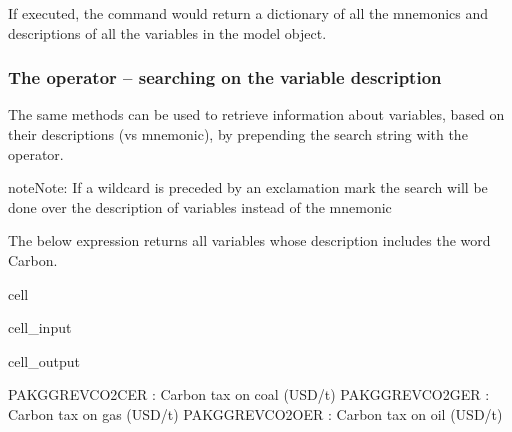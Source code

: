\documentclass[letterpaper,10pt,english]{jupyterBook}
\begin{document}
\sphinxAtStartPar
If executed, the command  would return a dictionary of all the mnemonics and descriptions of all the variables in the  model object.


\subsubsection{The \sphinxstyleliteralintitle{\sphinxupquote{!}} operator – searching on the variable description}
\label{\detokenize{content/05_WBModels/LoadingWBModel:the-operator-searching-on-the-variable-description}}
\sphinxAtStartPar
The same methods can be used to retrieve information about variables, based on their descriptions (vs mnemonic), by pre\sphinxhyphen{}pending the search string with the  \sphinxcode{\sphinxupquote{!}} operator.

\begin{sphinxadmonition}{note}{Note:}
\sphinxAtStartPar
{}
If a wildcard is preceded by an exclamation mark \sphinxstylestrong{!} the search will be done over the description of variables instead of the mnemonic
\end{sphinxadmonition}

\sphinxAtStartPar
The below expression returns all variables whose description includes the word Carbon.

\begin{sphinxuseclass}{cell}\begin{sphinxVerbatimInput}

\begin{sphinxuseclass}{cell_input}
\begin{sphinxVerbatim}[commandchars=\\\{\}]
\PYG{p}{[}\PYG{p}{]}
\end{sphinxVerbatim}

\end{sphinxuseclass}\end{sphinxVerbatimInput}
\begin{sphinxVerbatimOutput}

\begin{sphinxuseclass}{cell_output}
\begin{sphinxVerbatim}[commandchars=\\\{\}]
PAKGGREVCO2CER : Carbon tax on coal (USD/t)
PAKGGREVCO2GER : Carbon tax on gas (USD/t)
PAKGGREVCO2OER : Carbon tax on oil (USD/t)
\end{sphinxVerbatim}

\end{sphinxuseclass}\end{sphinxVerbatimOutput}

\end{sphinxuseclass}
\end{document}
